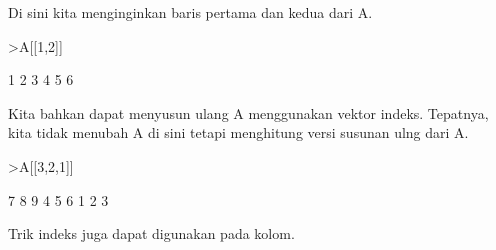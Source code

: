 \documentclass[a4paper,10pt]{article}
\begin{document}
\begin{eulernotebook}
\begin{eulercomment}
\begin{eulercomment}
\begin{eulercomment}
\begin{eulercomment}
\begin{eulercomment}
Di sini kita menginginkan baris pertama dan kedua dari A.
\end{eulercomment}
\begin{eulerprompt}
>A[[1,2]]
\end{eulerprompt}
\begin{euleroutput}
              1             2             3 
              4             5             6 
\end{euleroutput}
\begin{eulercomment}
Kita bahkan dapat menyusun ulang A menggunakan vektor indeks.
Tepatnya, kita tidak menubah A di sini tetapi menghitung versi susunan
ulng dari A.
\end{eulercomment}
\begin{eulerprompt}
>A[[3,2,1]]
\end{eulerprompt}
\begin{euleroutput}
              7             8             9 
              4             5             6 
              1             2             3 
\end{euleroutput}
\begin{eulercomment}
Trik indeks juga dapat digunakan pada kolom.


\end{eulercomment}
\end{eulercomment}
\end{eulercomment}
\end{eulercomment}
\end{eulercomment}
\end{eulernotebook}
\end{document}
